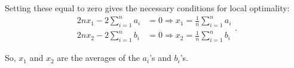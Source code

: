 \begin{homeworkProblem}
\begin{solution}
        Setting these equal to zero gives the necessary conditions for 
        local optimality:
        \[
            \begin{split}
                2n x_1 - 2\sum_{i=1}^n a_i &= 0 \Rightarrow x_1 = \frac{1}{n}\sum_{i=1}^n a_i \\
                2n x_2 - 2\sum_{i=1}^n b_i &= 0 \Rightarrow x_2 = \frac{1}{n}\sum_{i=1}^n b_i
            \end{split}.
        \]

        So, $x_1$ and $x_2$ are the averages of the $a_i$'s and $b_i$'s.

    \end{solution}

\end{homeworkProblem}